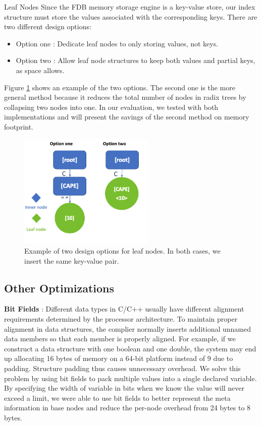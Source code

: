 \documentclass[sigplan,screen,nonacm]{acmart}
\makeatletter
\def\subsubsection{\@startsection{subsubsection}{3}%
  \z@{.5\linespacing\@plus.7\linespacing}{.1\linespacing}%
  {\normalfont\itshape}}
\makeatother
\begin{document}
\subsubsection{Leaf Nodes}
Since the FDB memory storage engine is a key-value store, our index structure must store the values associated with the corresponding keys. There are two different design options: 
\begin{itemize}
    \item Option one : Dedicate leaf nodes to only storing values, not keys.
    \item Option two : Allow leaf node structures to keep both values and partial keys, as space allows.
\end{itemize}
Figure \ref{fig:leaf-nodes} shows an example of the two options. The second one is the more general method because it reduces the total number of nodes in radix trees by collapsing two nodes into one. In our evaluation, we tested with both implementations and will present the savings of the second method on memory footprint. 
\begin{figure}[h]
  \centering
  \includegraphics[width=\linewidth, height=5.5cm]{pic/leaf nodes.png}
  \setlength{\belowcaptionskip}{-10pt} 
  \caption{Example of two design options for leaf nodes. In both cases, we insert the same key-value pair.}
  \label{fig:leaf-nodes}
\end{figure}

\subsection{Other Optimizations}
\textbf {Bit Fields} : Different data types in C/C++ usually have different alignment requirements determined by the processor architecture. To maintain proper alignment in data structures, the complier normally inserts additional unnamed data members so that each member is properly aligned. For example, if we construct a data structure with one boolean and one double, the system may end up allocating 16 bytes of memory on a 64-bit platform instead of 9 due to padding. Structure padding thus causes unnecessary overhead.  We solve this problem by using bit fields to pack multiple values into a single declared variable. By specifying the width of variable in bits when we know the value will never exceed a limit, we were able to use bit fields to better represent the meta information in base nodes and reduce the per-node overhead from 24 bytes to 8 bytes.
\end{document}
